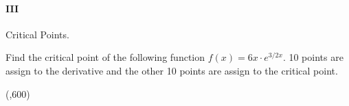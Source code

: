 \newpage

\paragraph{III} Critical Points.
\begin{preguntas}

\pregunta[20] Find the critical point of the following function \(f(x) = 6x\cdot e^{3/2x} \).
10 points are assign to the derivative and the other 10 points are assign to the critical point.

\begin{center}
    \framebox(\textwidth,600){} 
\end{center}


\end{preguntas}

